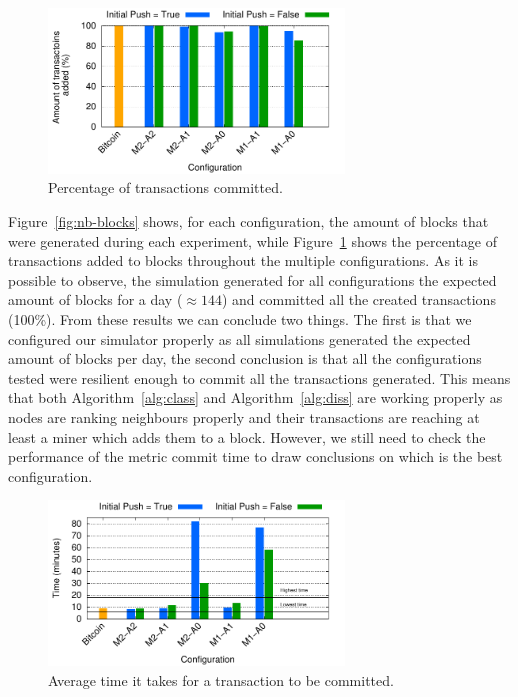 \begin{figure}[h]
\centering
\includegraphics[width=0.7\textwidth]{plots/tx-added.pdf}
\caption{Percentage of transactions committed.}
\label{fig:tx-added}
\end{figure}

Figure~\ref{fig:nb-blocks} shows, for each configuration, the amount of blocks that were generated during each experiment, while Figure~\ref{fig:tx-added} shows the percentage of transactions added to blocks throughout the multiple configurations. As it is possible to observe, the simulation generated for all configurations the expected amount of blocks for a day ($\approx 144$) and committed all the created transactions (100\%). From these results we can conclude two things. The first is that we configured our simulator properly as all simulations generated the expected amount of blocks per day, the second conclusion is that all the configurations tested were resilient enough to commit all the transactions generated. This means that both Algorithm~\ref{alg:class} and Algorithm~\ref{alg:diss} are working properly as nodes are ranking neighbours properly and their transactions are reaching at least a miner which adds them to a block. However, we still need to check the performance of the metric commit time to draw conclusions on which is the best configuration.

\begin{figure}[h]
\centering
\includegraphics[width=0.7\textwidth]{plots/commit-time.pdf}
\caption{Average time it takes for a transaction to be committed.}
\label{fig:commit-time}
\end{figure}

